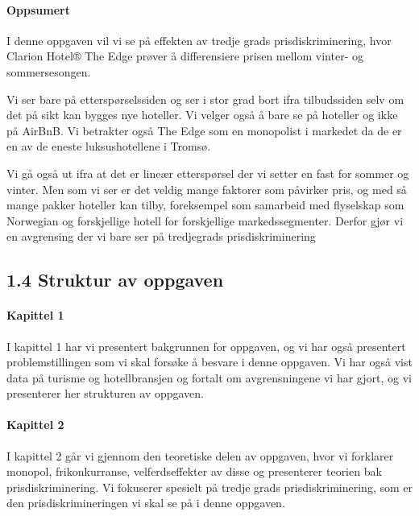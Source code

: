 \documentclass[
  12pt,
  a4paper,
  DIV=11,
  numbers=noendperiod]{scrartcl}
\let\oldparagraph\paragraph
\renewcommand{\paragraph}[1]{\oldparagraph{#1}\mbox{}}
\begin{document}
\paragraph{Oppsumert}\label{oppsumert}

I denne oppgaven vil vi se på effekten av tredje grads
prisdiskriminering, hvor Clarion Hotel® The Edge prøver å differensiere
prisen mellom vinter- og sommersesongen.

Vi ser bare på etterspørselssiden og ser i stor grad bort ifra
tilbudssiden selv om det på sikt kan bygges nye hoteller. Vi velger også
å bare se på hoteller og ikke på AirBnB. Vi betrakter også The Edge som
en monopolist i markedet da de er en av de eneste luksushotellene i
Tromsø.

Vi gå også ut ifra at det er lineær etterspørsel der vi setter en fast
for sommer og vinter. Men som vi ser er det veldig mange faktorer som
påvirker pris, og med så mange pakker hoteller kan tilby, foreksempel
som samarbeid med flyselskap som Norwegian og forskjellige hotell for
forskjellige markedssegmenter. Derfor gjør vi en avgrensing der vi bare
ser på tredjegrads prisdiskriminering

\subsection{1.4 Struktur av oppgaven}\label{struktur-av-oppgaven}

\paragraph{Kapittel 1}\label{kapittel-1}

I kapittel 1 har vi presentert bakgrunnen for oppgaven, og vi har også
presentert problemstillingen som vi skal forsøke å besvare i denne
oppgaven. Vi har også vist data på turisme og hotellbransjen og fortalt
om avgrensningene vi har gjort, og vi presenterer her strukturen av
oppgaven.

\paragraph{Kapittel 2}\label{kapittel-2}

I kapittel 2 går vi gjennom den teoretiske delen av oppgaven, hvor vi
forklarer monopol, frikonkurranse, velferdseffekter av disse og
presenterer teorien bak prisdiskriminering. Vi fokuserer spesielt på
tredje grads prisdiskriminering, som er den prisdiskrimineringen vi skal
se på i denne oppgaven.
\end{document}
